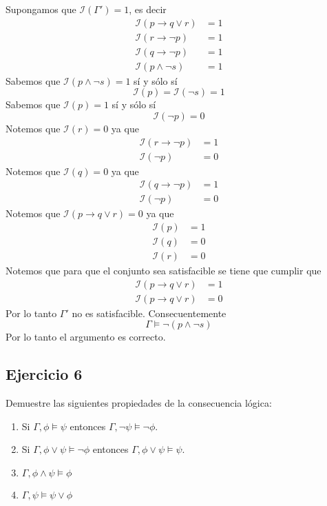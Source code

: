 \documentclass[a4paper]{article}
\begin{document}
Supongamos que \(\mathcal{I}\left(\Gamma'\right) = 1\), es decir
\begin{align*}
    \mathcal{I}\left(p \to q \lor r\right) &= 1 \\
    \mathcal{I}\left(r \to \lnot p\right) &= 1 \\
    \mathcal{I}\left(q \to \lnot p\right) &= 1 \\
    \mathcal{I}\left(p \land \lnot s\right) &= 1
\end{align*}
Sabemos que \(\mathcal{I}\left(p \land \lnot s\right) = 1\) sí y sólo sí
\[
    \mathcal{I}\left(p\right) = \mathcal{I}\left(\lnot s\right) = 1
\]
Sabemos que \(\mathcal{I}\left(p\right) = 1\) sí y sólo sí
\[
    \mathcal{I}\left(\neg p\right) = 0
\]
Notemos que \(\mathcal{I}\left(r\right) = 0\) ya que
\begin{align*}
    \mathcal{I}\left(r \to \lnot p\right) &= 1 \\
    \mathcal{I}\left(\neg p\right) &= 0
\end{align*}
Notemos que \(\mathcal{I}\left(q\right) = 0\) ya que
\begin{align*}
    \mathcal{I}\left(q \to \lnot p\right) &= 1 \\
    \mathcal{I}\left(\neg p\right) &= 0
\end{align*}
Notemos que \(\mathcal{I}\left(p \to q \lor r\right) = 0\) ya que
\begin{align*}
    \mathcal{I}\left(p\right) &= 1 \\
    \mathcal{I}\left(q\right) &= 0 \\
    \mathcal{I}\left(r\right) &= 0
\end{align*}
Notemos que para que el conjunto sea satisfacible se tiene que cumplir que
\begin{align*}
    \mathcal{I}\left(p \to q \lor r\right) &= 1 \\
    \mathcal{I}\left(p \to q \lor r\right) &= 0
\end{align*}
Por lo tanto \(\Gamma'\) no es satisfacible. Consecuentemente
\[
    \Gamma \models \lnot (p \land \lnot s)
\]
Por lo tanto el argumento es correcto.
\subsection{Ejercicio 6}
Demuestre las siguientes propiedades de la consecuencia l\'ogica:
\begin{enumerate}
    \item Si $\Gamma,\phi\models \psi$ entonces $\Gamma,\neg\psi\models \neg \phi$.
    \item Si $\Gamma,\phi\lor\psi\models \neg\phi$ entonces
    $\Gamma,\phi\lor\psi\models\psi$.
    \item $\Gamma,\phi\land\psi\models \phi$
    \item $\Gamma,\psi\models \psi\lor\phi$
\end{enumerate}
\end{document}
